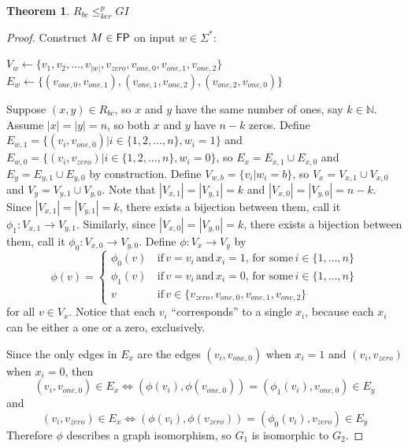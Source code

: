 \documentclass[draft]{article}
\newtheorem{theorem}{Theorem}%
\theoremstyle{definition}
\newcommand{\plain}[1]{\,\text{#1}\,} %
\newcommand{\sigmastar}{\Sigma^{*}}
\newcommand{\kr}{\leq^{p}_{ker}} %
\begin{document}
\begin{theorem}\label{thm:rbc_gi}$R_{bc}\kr GI$\end{theorem}
\begin{proof}
  Construct $M\in {\ensuremath{\mathsf{FP}}}$ on input $w \in \sigmastar$:\\
  \begin{algorithm}[H]
    $V_w\gets\{v_1, v_2, \ldots, v_{|w|}, v_{zero}, v_{one,0}, v_{one,1},
    v_{one,2}\}$\;
    $E_w\gets\{(v_{one,0}, v_{one,1}), (v_{one,1}, v_{one,2}), (v_{one,2},
    v_{one,0})\}$\; 
  \end{algorithm}
  
  Suppose $(x, y)\in R_{bc}$, so $x$ and $y$ have the same number of ones, say
  $k\in\mathbb{N}$. Assume $|x|=|y|=n$, so both $x$ and $y$ have $n-k$
  zeros. Define $E_{w,1}=\{(v_i, v_{one,0})|i\in\{1,2,\ldots,n\}, w_i = 1\}$
  and $E_{w,0}=\{(v_i, v_{zero})|i\in\{1,2,\ldots,n\}, w_i = 0\}$, so $E_x =
  E_{x,1}\cup E_{x,0}$ and $E_y = E_{y,1} \cup E_{y,0}$ by construction. Define
  $V_{w,b}=\{v_i|w_i=b\}$, so $V_x=V_{x,1} \cup V_{x,0}$ and $V_y=V_{y,1} \cup
  V_{y,0}$. Note that $|V_{x,1}|=|V_{y,1}|=k$ and
  $|V_{x,0}|=|V_{y,0}|=n-k$. Since $|V_{x,1}|=|V_{y,1}|=k$, there exists a
  bijection between them, call it $\phi_1:V_{x,1}\to V_{y,1}$. Similarly, since
  $|V_{x,0}|=|V_{y,0}|=k$, there exists a bijection between them, call it
  $\phi_0:V_{x,0}\to V_{y,0}$. Define $\phi:V_x\to V_y$ by
  \begin{displaymath}
    \phi(v) = 
    \begin{cases}
      \phi_0(v) & \plain{if} v = v_i \plain{and} x_i = 1, \plain{for some}
      i\in\{1,\ldots,n\}\\ 
      \phi_1(v) & \plain{if} v = v_i \plain{and} x_i = 0, \plain{for some}
      i\in\{1,\ldots,n\}\\ 
      v & \plain{if} v \in \{v_{zero}, v_{one,0}, v_{one,1}, v_{one,2}\}
    \end{cases}
  \end{displaymath}
  for all $v\in V_x$. Notice that each $v_i$ ``corresponds'' to a
  single $x_i$, because each $x_i$ can be either a one or a zero,
  exclusively.

  Since the only edges in $E_x$ are the edges $(v_i, v_{one,0})$ when $x_i=1$
  and $(v_i, v_{zero})$ when $x_i=0$, then 
  \begin{displaymath}
    (v_i, v_{one,0})\in E_x \iff (\phi(v_i), \phi(v_{one,0}))=(\phi_1(v_i),
    v_{one,0})\in E_y
  \end{displaymath}
  and 
  \begin{displaymath}
    (v_i, v_{zero})\in E_x \iff (\phi(v_i), \phi(v_{zero})) = (\phi_0(v_i),
    v_{zero})\in E_y
  \end{displaymath}
  Therefore $\phi$ describes a graph isomorphism, so $G_1$ is isomorphic to
  $G_2$.
  

\end{proof}
\end{document}

